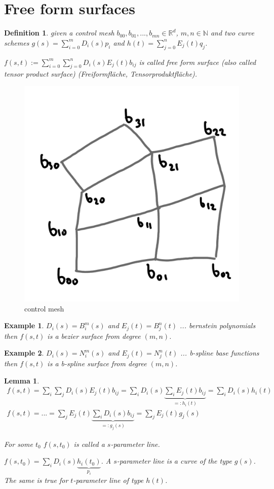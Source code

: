 \documentclass[]{article}
\newtheorem{lemma}{Lemma}
\newtheorem{definition}{Definition}
\newtheorem{example}{Example}
\begin{document}
\section{Free form surfaces}

\begin{definition}
	given a control mesh $b_{00}, b_{01}, ..., b_{mn} \in \mathbb{R}^d$, $m,n \in \mathbb{N}$ and two curve schemes $g(s) = \sum_{i=0}^{m}D_i(s)p_i$ and $h(t)=\sum_{j=0}^{n}E_j(t)q_j$.
	
	$f(s,t) := \sum_{i=0}^{m} \sum_{j=0}^{n} D_i(s) E_j(t) b_{ij}$ is called free form surface (also called tensor product surface) (Freiformfläche, Tensorproduktfläche).
\end{definition}

\begin{figure}[h!]
	\centering
	\includegraphics[width=0.3\linewidth]{figures/control_mesh}
	\caption{control mesh}
	\label{fig:control_mesh}
\end{figure}

\begin{example}
	$D_i(s) = B_i^m(s)$ and $E_j(t)=B_j^n(t)$ ... bernstein polynomials then $f(s,t)$ is a bezier surface from degree $(m,n)$.
\end{example}

\begin{example}
	$D_i(s) = N_i^m(s)$ and $E_j(t)=N_j^n(t)$ ... b-spline base functions then $f(s,t)$ is a b-spline surface from degree $(m,n)$.
\end{example}

\begin{lemma}
	\begin{align*}
		f(s,t) = \sum_i \sum_j D_i(s) E_j(t) b_{ij} = \sum_i D_i(s) \underbrace{\sum_i E_j(t) b_{ij}}_{=: h_i(t)} = \sum_i D_i(s)h_i(t)\\
		f(s,t) = ... = \sum_j E_j(t) \underbrace{\sum_i D_i(s) b_{ij}}_{=: g_j(s)} = \sum_j E_j(t) g_j(s)
	\end{align*}
	
	For some $t_0$ $f(s,t_0)$ is called a $s$-parameter line.
	
	$f(s,t_0) = \sum_i D_i(s)\underbrace{h_i(t_0)}_{p_i}$. A $s$-parameter line is a curve of the type $g(s)$. The same is true for $t$-parameter line of type $h(t)$.
\end{lemma}
\end{document}
